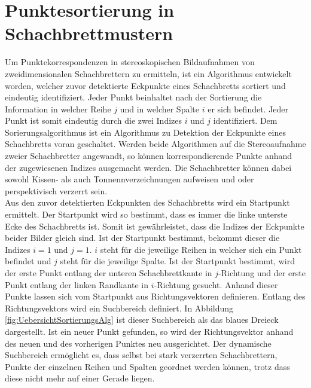 \chapter{Punktesortierung in Schachbrettmustern}
\label{sec:schachbrettAlg} 


Um Punktekorrespondenzen in stereoskopischen Bildaufnahmen von zweidimensionalen Schachbrettern zu ermitteln, ist ein Algorithmus entwickelt worden, welcher zuvor detektierte Eckpunkte eines Schachbretts sortiert und eindeutig identifiziert. Jeder Punkt beinhaltet nach der Sortierung die Information in welcher Reihe $j$ und in welcher Spalte $i$ er sich befindet. Jeder Punkt ist somit eindeutig durch die zwei Indizes $i$ und $j$ identifiziert. Dem Sorierungsalgorithmus ist ein Algorithmus zu Detektion der Eckpunkte eines Schachbretts voran geschaltet. Werden beide Algorithmen auf die Stereoaufnahme zweier Schachbretter angewandt, so können korrespondierende Punkte anhand der zugewiesenen Indizes ausgemacht werden. Die Schachbretter können dabei sowohl Kissen- als auch Tonnennverzeichnungen aufweisen und oder perspektivisch verzerrt sein.\\ 





Aus den zuvor detektierten Eckpunkten des Schachbretts wird ein Startpunkt ermittelt. Der Startpunkt wird so bestimmt, dass es immer die linke unterste Ecke des Schachbretts ist. Somit ist gewährleistet, dass die Indizes der Eckpunkte beider Bilder gleich sind. Ist der Startpunkt bestimmt, bekommt dieser die Indizes $i = 1$ und $j = 1$. $i$ steht für die jeweilige Reihen in welcher sich ein Punkt befindet und $j$ steht für die jeweilige Spalte. Ist der Startpunkt bestimmt, wird der erste Punkt entlang der unteren Schachbrettkante in $j$-Richtung und der erste Punkt entlang der linken Randkante in $i$-Richtung gesucht. Anhand dieser Punkte lassen sich vom Startpunkt aus Richtungsvektoren definieren. Entlang des Richtungsvektors wird ein Suchbereich definiert. In Abbildung \ref{fig:UebersichtSortierungsAlg} ist dieser Suchbereich als das blaues Dreieck dargestellt. Ist ein neuer Punkt gefunden, so wird der Richtungsvektor anhand des neuen und des vorherigen Punktes neu ausgerichtet. Der dynamische Suchbereich ermöglicht es, dass selbst bei stark verzerrten Schachbrettern, Punkte der einzelnen Reihen und Spalten geordnet werden können, trotz dass diese nicht mehr auf einer Gerade liegen.

